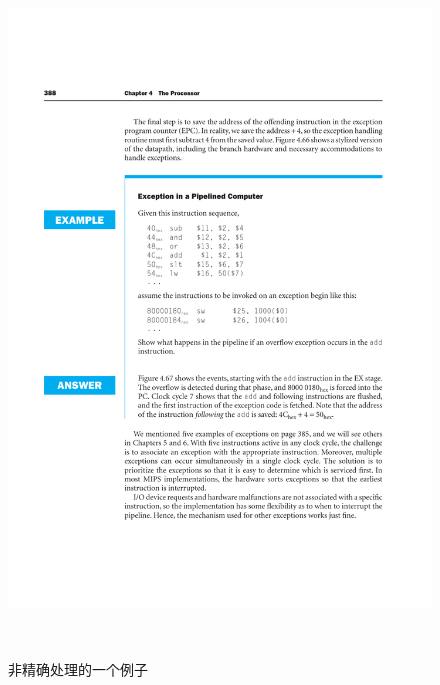 \documentclass[]{report}
\begin{document}
		\begin{figure}[h]
			\centering
			\begin{minipage}{20em}
				\centering
				\begin{minipage}{20em}
					\centering
					\includegraphics[scale = 0.3]{images/Example_for_Pipeline_NonExact.pdf}
					\caption{非精确处理的一个例子}
				\end{minipage}
				\\[10pt]
				\begin{minipage}{20em}
					\centering

\end{minipage}
\end{minipage}
\end{figure}
\end{document}
